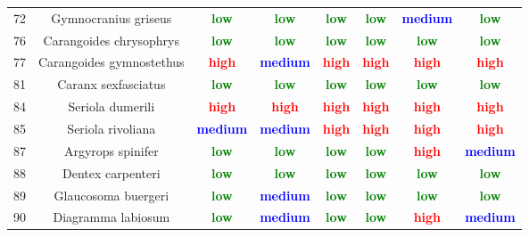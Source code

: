 \documentclass{report}\usepackage[]{graphicx}\usepackage[]{color}
\begin{document}
\begin{table}[ht]
{\begin{tabular}{cccccccc}
   72 & Gymnocranius griseus & \textcolor{green}{\textbf{low}} & \textcolor{green}{\textbf{low}} & \textcolor{green}{\textbf{low}} & \textcolor{green}{\textbf{low}} & \textcolor{blue}{\textbf{medium}} & \textcolor{green}{\textbf{low}} \\ 
   76 & Carangoides chrysophrys & \textcolor{green}{\textbf{low}} & \textcolor{green}{\textbf{low}} & \textcolor{green}{\textbf{low}} & \textcolor{green}{\textbf{low}} & \textcolor{green}{\textbf{low}} & \textcolor{green}{\textbf{low}} \\ 
   77 & Carangoides gymnostethus & \textcolor{red}{\textbf{high}} & \textcolor{blue}{\textbf{medium}} & \textcolor{red}{\textbf{high}} & \textcolor{red}{\textbf{high}} & \textcolor{red}{\textbf{high}} & \textcolor{red}{\textbf{high}} \\ 
   81 & Caranx sexfasciatus & \textcolor{green}{\textbf{low}} & \textcolor{green}{\textbf{low}} & \textcolor{green}{\textbf{low}} & \textcolor{green}{\textbf{low}} & \textcolor{green}{\textbf{low}} & \textcolor{green}{\textbf{low}} \\ 
   84 & Seriola dumerili & \textcolor{red}{\textbf{high}} & \textcolor{red}{\textbf{high}} & \textcolor{red}{\textbf{high}} & \textcolor{red}{\textbf{high}} & \textcolor{red}{\textbf{high}} & \textcolor{red}{\textbf{high}} \\ 
   85 & Seriola rivoliana & \textcolor{blue}{\textbf{medium}} & \textcolor{blue}{\textbf{medium}} & \textcolor{red}{\textbf{high}} & \textcolor{red}{\textbf{high}} & \textcolor{red}{\textbf{high}} & \textcolor{red}{\textbf{high}} \\ 
   87 & Argyrops spinifer & \textcolor{green}{\textbf{low}} & \textcolor{green}{\textbf{low}} & \textcolor{green}{\textbf{low}} & \textcolor{green}{\textbf{low}} & \textcolor{red}{\textbf{high}} & \textcolor{blue}{\textbf{medium}} \\ 
   88 & Dentex carpenteri & \textcolor{green}{\textbf{low}} & \textcolor{green}{\textbf{low}} & \textcolor{green}{\textbf{low}} & \textcolor{green}{\textbf{low}} & \textcolor{green}{\textbf{low}} & \textcolor{green}{\textbf{low}} \\ 
   89 & Glaucosoma buergeri & \textcolor{green}{\textbf{low}} & \textcolor{blue}{\textbf{medium}} & \textcolor{green}{\textbf{low}} & \textcolor{green}{\textbf{low}} & \textcolor{green}{\textbf{low}} & \textcolor{green}{\textbf{low}} \\ 
   90 & Diagramma labiosum & \textcolor{green}{\textbf{low}} & \textcolor{blue}{\textbf{medium}} & \textcolor{green}{\textbf{low}} & \textcolor{green}{\textbf{low}} & \textcolor{red}{\textbf{high}} & \textcolor{blue}{\textbf{medium}} \\ 

\end{tabular}}
\end{table}
\end{document}
